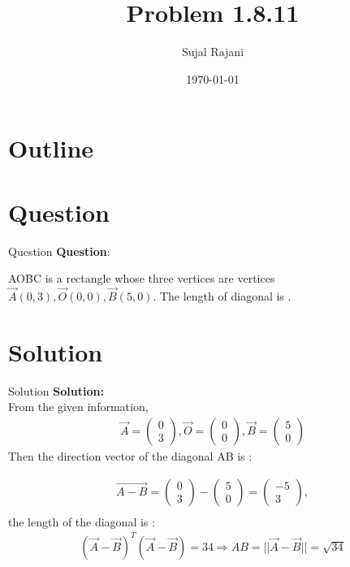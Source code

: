 \documentclass{beamer}
\title{Problem 1.8.11}
\author{Sujal Rajani}
\date{\today}
\theoremstyle{remark}
\newcommand{\myvec}[1]{\ensuremath{\begin{pmatrix}#1\end{pmatrix}}}
\numberwithin{equation}{section}
\begin{document}
\begin{frame}
\titlepage
\end{frame}

\section*{Outline}
\begin{frame}
\tableofcontents
\end{frame}
\section{Question}
\begin{frame}{Question}
\textbf{Question}:


\noindent AOBC is a rectangle whose three vertices are vertices $\vec{A}(0,3),\vec{O}(0,0),\vec{B}(5,0)$. The 
length of diagonal is \underline{\hspace{2cm}}.   

\end{frame}

    

\section{Solution}
\begin{frame}{Solution}
\textbf{Solution:} 
\\
From the given information,
\begin{align}
		\vec{A} = \myvec{0\\3},\vec{O} = \myvec{0\\0},\vec{B} = \myvec{5\\0} 
\end{align}
Then the direction vector  of the diagonal AB is :

\begin{align}
    \vec{A-B}=\myvec{0\\3}-\myvec{5\\0}=\myvec{-5\\3},
    \\
  \end{align}
the length of the diagonal is :
\begin{align}
    (\vec{A}-\vec{B})^T(\vec{A}-\vec{B})=34
    
    
    
    
    
     \Rightarrow AB=||\vec{A}-\vec{B}||=\sqrt{34}	 
    \end{align}
    \end{frame}
\end{document}

